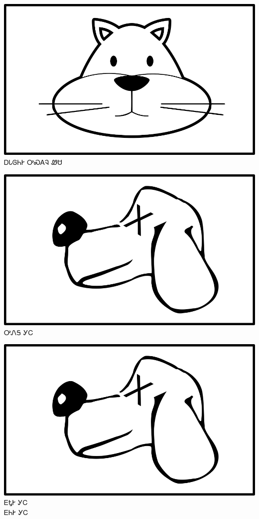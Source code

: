 \documentclass[avery5371]{flashcards}%
\begin{document}
    \begin{flashcard}{
        \includegraphics[width=0.95\columnwidth,height=.51\columnwidth,keepaspectratio]{../artwork/for-colors/wesa}
    }
        \Huge ᎠᏓᎶᏂᎨ ᎤᏍᎪᎸ ᏪᏌ
    \end{flashcard}

    \begin{flashcard}{
        \includegraphics[width=0.95\columnwidth,height=.51\columnwidth,keepaspectratio]{../artwork/for-colors/gihli-dead}
    }
        \Huge ᎤᏁᎦ ᎩᏟ
    \end{flashcard}

    \begin{flashcard}{
        \includegraphics[width=0.95\columnwidth,height=.51\columnwidth,keepaspectratio]{../artwork/for-colors/gihli-dead}
    }
        \Huge ᎬᎿᎨ ᎩᏟ\\ᎬᏂᎨ ᎩᏟ
    \end{flashcard}
\end{document}
